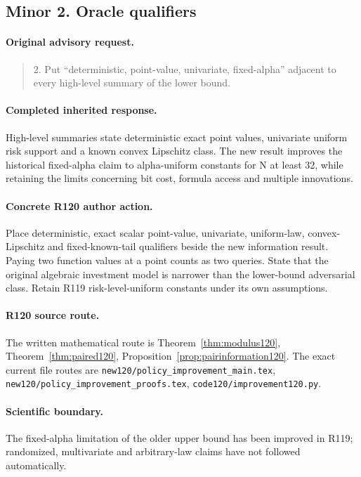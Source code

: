 \subsection{Minor 2. Oracle qualifiers}
\label{response120:minor-2}
\paragraph{Original advisory request.}
\begin{quote}
2. Put “deterministic, point-value, univariate, fixed-alpha” adjacent to every high-level summary of the lower bound.
\end{quote}
\paragraph{Completed inherited response.}
High-level summaries state deterministic exact point values, univariate uniform risk support and a known convex Lipschitz class. The new result improves the historical fixed-alpha claim to alpha-uniform constants for N at least 32, while retaining the limits concerning bit cost, formula access and multiple innovations.
\paragraph{Concrete R120 author action.}
Place deterministic, exact scalar point-value, univariate, uniform-law, convex-Lipschitz and fixed-known-tail qualifiers beside the new information result. Paying two function values at a point counts as two queries. State that the original algebraic investment model is narrower than the lower-bound adversarial class. Retain R119 risk-level-uniform constants under its own assumptions.
\paragraph{R120 source route.}
The written mathematical route is Theorem~\ref{thm:modulus120}, Theorem~\ref{thm:paired120}, Proposition~\ref{prop:pairinformation120}. The exact current file routes are \nolinkurl{new120/policy_improvement_main.tex}, \nolinkurl{new120/policy_improvement_proofs.tex}, \nolinkurl{code120/improvement120.py}.
\paragraph{Scientific boundary.}
The fixed-alpha limitation of the older upper bound has been improved in R119; randomized, multivariate and arbitrary-law claims have not followed automatically.

